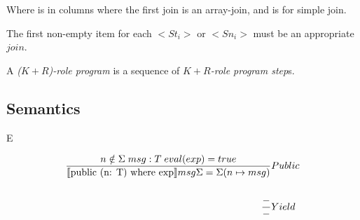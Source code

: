 \documentclass[acmsmall,review,anonymous]{acmart}\settopmatter{printfolios=true}
\begin{document}
Where  is  in columns where the first join is an array-join, and  is for simple join.

The first non-empty item for each $<St_i>$ or $<Sn_i>$ must be an appropriate $join$.

A \emph{($K+R$)-role program} is a sequence of \emph{$K+R$-role program step}s.

\vfill
\pagebreak

\subsection{Semantics}

E

\begin{align*}
	\judge{&Public}{
		n \notin \Sigma \; msg : T \; eval(exp) = true 
	}{
		\semfunc[\text{public (n: T) where exp}] msg  \Sigma = \Sigma (n \mapsto msg )
	}\\
	\\
	\judge{&Yield}{
		-
	}{
		-
	}
\end{align*}






\newpage

%



\newpage


% 

%
\end{document}
